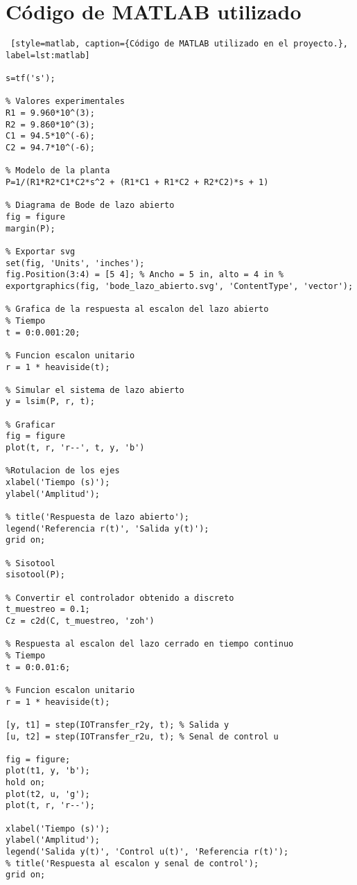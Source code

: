 \section{Código de MATLAB utilizado} \label{anexoE}
\begin{adjustwidth}{0.5cm}{0.5cm}
\begin{lstlisting} [style=matlab, caption={Código de MATLAB utilizado en el proyecto.}, label=lst:matlab]

s=tf('s');

% Valores experimentales
R1 = 9.960*10^(3);
R2 = 9.860*10^(3);
C1 = 94.5*10^(-6);
C2 = 94.7*10^(-6);

% Modelo de la planta
P=1/(R1*R2*C1*C2*s^2 + (R1*C1 + R1*C2 + R2*C2)*s + 1)

% Diagrama de Bode de lazo abierto
fig = figure 
margin(P); 

% Exportar svg
set(fig, 'Units', 'inches');
fig.Position(3:4) = [5 4]; % Ancho = 5 in, alto = 4 in %
exportgraphics(fig, 'bode_lazo_abierto.svg', 'ContentType', 'vector'); 

% Grafica de la respuesta al escalon del lazo abierto
% Tiempo
t = 0:0.001:20;

% Funcion escalon unitario
r = 1 * heaviside(t);

% Simular el sistema de lazo abierto
y = lsim(P, r, t);

% Graficar
fig = figure 
plot(t, r, 'r--', t, y, 'b')

%Rotulacion de los ejes
xlabel('Tiempo (s)'); 
ylabel('Amplitud'); 

% title('Respuesta de lazo abierto');
legend('Referencia r(t)', 'Salida y(t)'); 
grid on; 

% Sisotool
sisotool(P);

% Convertir el controlador obtenido a discreto
t_muestreo = 0.1;
Cz = c2d(C, t_muestreo, 'zoh')

% Respuesta al escalon del lazo cerrado en tiempo continuo
% Tiempo
t = 0:0.01:6;

% Funcion escalon unitario
r = 1 * heaviside(t);

[y, t1] = step(IOTransfer_r2y, t); % Salida y
[u, t2] = step(IOTransfer_r2u, t); % Senal de control u

fig = figure; 
plot(t1, y, 'b'); 
hold on; 
plot(t2, u, 'g'); 
plot(t, r, 'r--'); 

xlabel('Tiempo (s)'); 
ylabel('Amplitud'); 
legend('Salida y(t)', 'Control u(t)', 'Referencia r(t)'); 
% title('Respuesta al escalon y senal de control');
grid on; 


\end{lstlisting}
\end{adjustwidth}
